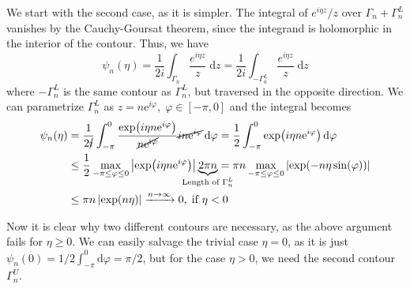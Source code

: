 We start with the second case, as it is simpler. The integral of \(e^{i \eta z}/z\) over \(\Gamma_n + \Gamma_n^L\) vanishes
by the Cauchy-Goursat theorem, since the integrand is holomorphic in the interior of the contour. Thus, we have
\begin{equation}
    \psi _n(\eta ) = \frac{1}{2i} \int_{\Gamma_n} \frac{e^{i \eta z}}{z}\; \mathrm{d}z = \frac{1}{2i} \int_{-\Gamma_n^L} \frac{e^{i \eta z}}{z}\; \mathrm{d}z
\end{equation}
where \(-\Gamma_n^L\) is the same contour as \(\Gamma_n^L\), but traversed in the opposite direction. We can parametrize
\(\Gamma _n^L\) as \(z = n \mathrm{e}^{i \varphi },\; \varphi  \in \left[ -\pi , 0 \right]  \) and the integral becomes
\begin{align}
    \psi _n(\eta ) &= \frac{1}{2\cancel{i}} \int_{-\pi }^{0} \frac{\exp(i \eta  n \mathrm{e}^{i \varphi }) } {\cancel{n \mathrm{e^{i \varphi }}} }
    \cancel{i n \mathrm{e}^{i \varphi }}  \,\mathrm{d}\varphi = \frac{1}{2}\int_{-\pi }^{0} \exp (i \eta  n \mathrm{e}^{i \varphi } )  \,\mathrm{d}\varphi \nonumber\\
    &\leq \frac{1}{2} \max_{-\pi \leq \varphi \leq 0 }\abs{\exp (i \eta  n \mathrm{e}^{i \varphi } ) } \underbrace{2 \pi  n}_{\mathclap{\text{Length of }\Gamma_n^L }}
    = \pi  n \max_{-\pi \leq \varphi \leq 0}\left\vert \exp(-n \eta \sin (\varphi )) \right\vert \nonumber\\
    &\leq \pi  n \left\vert \exp (n \eta ) \right\vert \xrightarrow{n\to \infty } 0,\; \text{if } \eta  < 0 
\end{align} 

Now it is clear why two different contours are necessary, as the above argument fails for \(\eta \geq 0\). 
We can easily salvage the trivial case \(\eta = 0\), as it is just \(\psi_n(0) = 1/2 \int_{-\pi }^{0} \mathrm{d} \varphi = \pi /2\),
but for the case \(\eta  > 0\), we need the second contour \(\Gamma _n^U\).

